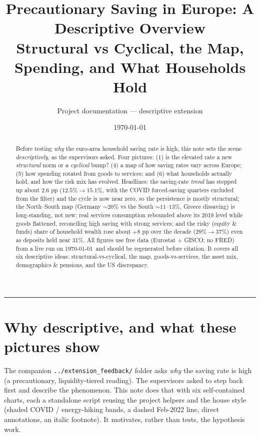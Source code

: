 \documentclass[11pt,a4paper]{article}
\title{\textbf{Precautionary Saving in Europe: A Descriptive Overview}\\[3pt]
       \large Structural vs Cyclical, the Map, Spending, and What Households Hold}
\author{Project documentation --- descriptive extension}
\date{\today}
\newcommand{\code}[1]{\texttt{#1}}
\begin{document}
\maketitle
\thispagestyle{empty}

\begin{abstract}
\noindent
Before testing \emph{why} the euro-area household saving rate is high, this note
sets the scene \emph{descriptively}, as the supervisors asked. Four pictures: (1)
is the elevated rate a new \emph{structural} norm or a \emph{cyclical} bump? (4) a
map of how saving rates vary across Europe; (5) how spending rotated from goods to
services; and (6) what households actually hold, and how the risk mix has evolved.
Headlines: the saving-rate \emph{trend} has stepped up about $2.6$ pp
($12.5\%\!\to\!15.1\%$, with the COVID forced-saving quarters excluded from the
filter) and the cycle is now near zero, so the persistence is mostly
structural; the North--South map (Germany ${\sim}20\%$ vs the South ${\sim}11$--$13\%$,
Greece dissaving) is long-standing, not new; real services consumption rebounded
above its 2019 level while goods flattened, reconciling high saving with strong
services; and the risky (equity \& funds) share of household wealth rose about
$+8$ pp over the decade ($29\%\!\to\!37\%$) even as deposits held near $31\%$. All
figures use free data (Eurostat + GISCO; no FRED) from a live run on \today\ and
should be regenerated before citation. It covers all six descriptive ideas:
structural-vs-cyclical, the map, goods-vs-services, the asset mix, demographics \&
pensions, and the US discrepancy.
\end{abstract}

\tableofcontents
\bigskip\hrule\bigskip

\section{Why descriptive, and what these pictures show}\label{sec:intro}
The companion \code{../extension\_feedback/} folder asks \emph{why} the saving
rate is high (a precautionary, liquidity-tiered reading). The supervisors asked
to step back first and describe the phenomenon. This note does that with six
self-contained charts, each a standalone script reusing the project helpers and
the house style (shaded COVID / energy-hiking bands, a dashed Feb-2022 line,
direct annotations, an italic footnote). It motivates, rather than tests, the
hypothesis work.
\end{document}
